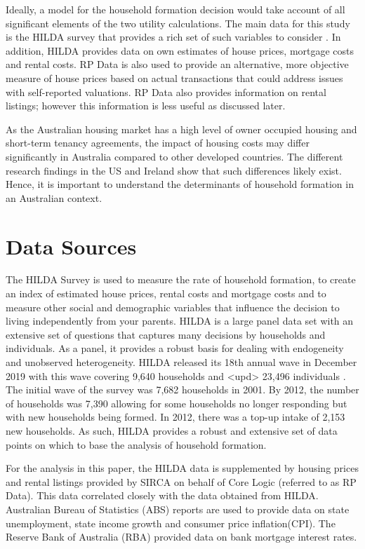 \documentclass[12pt]{article}
\begin{document}
Ideally, a model for the household formation decision would take account of all significant elements of the two utility calculations. The main data for this study is the HILDA survey that provides a rich set of such variables to consider \parencite{HILDA2019Manual}. In addition, HILDA provides data on own estimates of house prices, mortgage costs and rental costs. RP Data is also used to provide an alternative, more objective measure of house prices based on actual transactions that could address issues with self-reported valuations. RP Data also provides information on rental listings; however this information is less useful as discussed later.

As the Australian housing market has a high level of owner occupied housing and short-term tenancy agreements, the impact of housing costs may differ significantly in Australia compared to other developed countries. The different research findings in the US and Ireland show that such differences likely exist. Hence, it is important to understand the determinants of household formation in an Australian context.

\section{Data Sources}

The HILDA Survey is used to measure the rate of household formation, to create an index of estimated house prices, rental costs and mortgage costs and to measure other social and demographic variables that influence the decision to living independently from your parents. HILDA is a large panel data set with an extensive set of questions that captures many decisions by households and individuals. As a panel, it provides a robust basis for dealing with endogeneity and unobserved heterogeneity. HILDA released its 18th annual wave in December 2019 with this wave covering 9,640 households and <upd> 23,496 individuals \parencite{HILDA2019Manual}. The initial wave of the survey was 7,682 households in 2001. By 2012, the number of households was 7,390 allowing for some households no longer responding but with new households being formed. In 2012, there was a top-up intake of 2,153 new households. As such, HILDA provides a robust and extensive set of data points on which to base the analysis of household formation.

For the analysis in this paper, the HILDA data is supplemented by housing prices and rental listings provided by SIRCA on behalf of Core Logic (referred to as RP Data). This data correlated closely with the data obtained from HILDA. Australian Bureau of Statistics (ABS) reports are used to provide data on state unemployment, state income growth and consumer price inflation(CPI). The Reserve Bank of Australia (RBA) provided data on bank mortgage interest rates.
\end{document}
